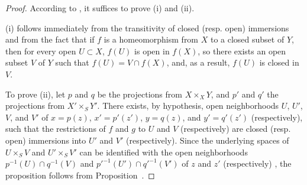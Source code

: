 \begin{proof}
\label{proof-1.4.5.5}
According to , it suffices to prove (i) and (ii).

(i) follows immediately from the transitivity of closed (resp. open) immersions  and from the fact that if $f$ is a homeomorphism from $X$ to a closed subset of $Y$, then for every open $U\subset X$, $f(U)$ is open in $f(X)$, so there exists an open subset $V$ of $Y$ such that $f(U)=V\cap f(X)$, and, as a result, $f(U)$ is closed in $V$.

To prove (ii), let $p$ and $q$ be the projections from $X\times_X Y$, and $p'$ and $q'$ the projections from $X'\times_S Y'$.
There exists, by hypothesis, open neighborhoods $U$, $U'$, $V$, and $V'$ of $x=p(z)$, $x'=p'(z')$, $y=q(z)$, and $y'=q'(z')$ (respectively), such that the restrictions of $f$ and $g$ to $U$ and $V$ (respectively) are closed (resp. open) immersions into $U'$ and $V'$ (respectively).
Since the underlying spaces of $U\times_S V$ and $U'\times_S V'$ can be identified with the open neighborhoods $p^{-1}(U)\cap q^{-1}(V)$ and ${p'}^{-1}(U')\cap{q'}^{-1}(V')$ of $z$ and $z'$ (respectively) , the proposition follows from Proposition~.
\end{proof}

